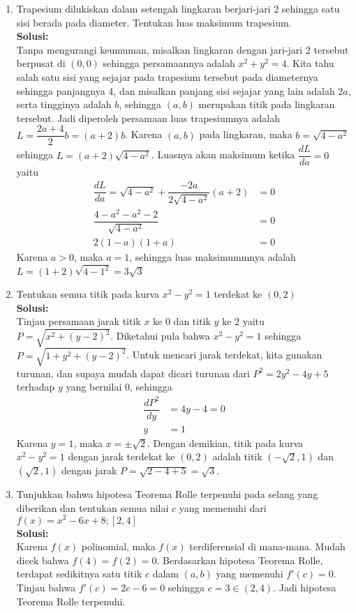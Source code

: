 \documentclass{article}
\begin{document}
\begin{enumerate}
	 \item Trapesium dilukiskan dalam setengah lingkaran berjari-jari 2 sehingga satu sisi berada pada diameter. Tentukan luas maksimum trapesium.
	 \\[0.1 cm] \textbf{Solusi:}\\
	 Tanpa mengurangi keumuman, misalkan lingkaran dengan jari-jari 2 tersebut berpusat di $(0,0)$ sehingga persamaannya adalah $x^2+y^2=4$.  Kita tahu salah satu sisi yang sejajar pada trapesium tersebut pada diameternya sehingga panjangnya 4, dan misalkan panjang sisi sejajar yang lain adalah $2a$, serta tingginya adalah $b$, sehingga $(a,b)$ merupakan titik pada lingkaran tersebut. Jadi diperoleh persamaan luas trapesiumnya adalah $L=\dfrac{2a+4}{2}b=(a+2)b$. Karena $(a,b)$ pada lingkaran, maka $b=\sqrt{4-a^2}$ sehingga $L=(a+2)\sqrt{4-a^2}$. Luasnya akan maksimum ketika $\dfrac{dL}{da} = 0$ yaitu
	 \begin{align*}
	 \dfrac{dL}{da} = \sqrt{4-a^2} + \dfrac{-2a}{2\sqrt{4-a^2}}(a+2) &=0 \\
	 \dfrac{4-a^2-a^2-2}{\sqrt{4-a^2}} &= 0\\
	 2(1-a)(1+a) &= 0
	 \end{align*}
	 Karena $a>0$, maka $a=1$, sehingga luas maksimummnya adalah $L=(1+2)\sqrt{4-1^2}=3\sqrt{3}$
	 \item Tentukan semua titik pada kurva $x^2-y^2=1$ terdekat ke $(0,2)$
	 \\[0.1 cm] \textbf{Solusi:}\\
	 Tinjau persamaan jarak titik $x$ ke $0$ dan titik $y$ ke $2$ yaitu $P=\sqrt{x^2+(y-2)^2}$. Diketahui pula bahwa $x^2-y^2=1$ sehingga $P=\sqrt{1+y^2+(y-2)^2}$. Untuk mencari jarak terdekat, kita gunakan turunan, dan supaya mudah dapat dicari turunan dari $P^2=2y^2-4y+5$ terhadap $y$ yang bernilai 0, sehingga 
	 \begin{align*}
	 \dfrac{dP^2}{dy} &= 4y-4 = 0 \\
	 y &= 1
	 \end{align*}
	 Karena $y=1$, maka $x=\pm \sqrt{2}$. Dengan demikian, titik pada kurva $x^2-y^2=1$ dengan jarak terdekat ke $(0,2)$ adalah titik $(-\sqrt{2},1)$ dan $(\sqrt{2},1)$ dengan jarak $P=\sqrt{2-4+5}=\sqrt{3}$.
	 \item Tunjukkan bahwa hipotesa Teorema Rolle terpenuhi pada selang yang diberikan dan tentukan semua nilai $c$ yang memenuhi dari $f(x)=x^2-6x+8; [2,4]$ \\
	 \textbf{Solusi:} \\
	 Karena $f(x)$ polinomial, maka $f(x)$ terdiferensial di mana-mana. Mudah dicek bahwa $f(4)=f(2)=0$. Berdasarkan hipotesa Teorema Rolle, terdapat sedikitnya satu titik $c$ dalam $(a,b)$ yang memenuhi $f'(c)=0$. Tinjau bahwa $f'(c)=2c-6=0$ sehingga $c=3 \in (2,4)$. Jadi hipotesa Teorema Rolle terpenuhi.

\end{enumerate}
\end{document}
